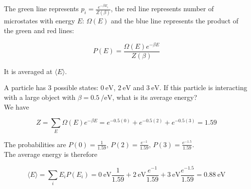 \begin{texample}
	The green line represents $p_i=\frac{e^{-\beta E_i}}{Z(\beta)}$, the red line represents number of microstates with energy $E$: $\Omega(E)$ and the blue line represents the product of the green and red lines:
	
	$$P(E)=\frac{\Omega(E)e^{-\beta E}}{Z(\beta)}$$
	
	It is averaged at $\langle E \rangle$.
\end{texample}

\begin{texample}
	A particle has $3$ possible states: $\SI{0}{\electronvolt}$, $\SI{2}{\electronvolt}$ and $\SI{3}{\electronvolt}$. If this particle is interacting with a large object with $\beta=\SI{0.5}{\per\electronvolt}$, what is its average energy? \\
	
	We have
	
	$$Z=\sum_E \Omega(E)e^{-\beta E}=e^{-0.5 (0)}+e^{-0.5 (2)}+e^{-0.5 (3)}=1.59$$
	
	The probabilities are $P(0)=\frac{1}{1.59}$, $P(2)=\frac{e^{-1}}{1.59}$, $P(3)=\frac{e^{-1.5}}{1.59}$. \\
	
	The average energy is therefore
	
	$$\langle E \rangle = \sum_i E_i P(E_i) = \SI{0}{\electronvolt}\frac{1}{1.59}+\SI{2}{\electronvolt}\frac{e^{-1}}{1.59}+\SI{3}{\electronvolt}\frac{e^{-1.5}}{1.59}=\SI{0.88}{\electronvolt}$$
\end{texample}

